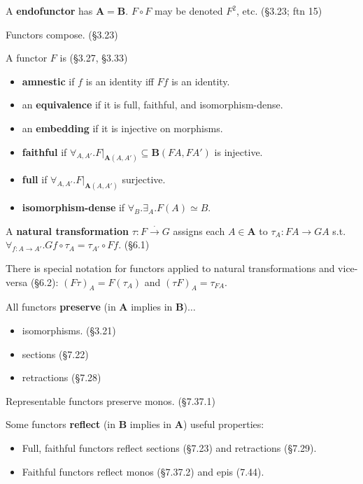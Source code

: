 \documentclass[10pt,twocolumn,letterpaper]{article}
\newcommand{\natto}{\overset{\cdot}{\to}}
\newcommand{\defn}[1]{{\bf #1}}
\begin{document}
  A \defn{endofunctor} has $\mathbf{A} = \mathbf{B}$.  $F \circ F$ may be
  denoted $F^2$, etc. (\S3.23; ftn 15)

  Functors compose. (\S3.23)

  A functor $F$ is (\S3.27, \S3.33)
  \begin{itemize}
    \item \defn{amnestic} if $f$ is an identity iff $Ff$ is an identity.
    \item an \defn{equivalence} if it is full, faithful, and
      isomorphism-dense.
    \item an \defn{embedding} if it is injective on morphisms.
    \item \defn{faithful} if $\forall_{A,A'} . F\vert_{\mathbf{A}(A,A')}
      \subseteq \mathbf{B}(FA, FA')$ is injective.
    \item \defn{full} if $\forall_{A,A'} . F\vert_{\mathbf{A}(A,A')}$ surjective.
    \item \defn{isomorphism-dense} if $\forall_B . \exists_A . F(A) \simeq B$.
  \end{itemize}

  A \defn{natural transformation} $\tau : F \natto G$ assigns each
  $A \in \mathbf{A}$ to $\tau_A : FA \to GA$ s.t.
  $\forall_{f : A \to A'} . G f \circ \tau_A = \tau_{A'} \circ F f$. (\S6.1)

  There is special notation for functors applied to natural transformations
  and vice-versa (\S6.2): $(F\tau)_A = F(\tau_A)$ and $(\tau F)_A =
  \tau_{FA}$.

  All functors \defn{preserve} (in $\mathbf{A}$ implies in $\mathbf{B}$)$\dots$
    \begin{itemize}
      \item isomorphisms. (\S3.21)
      \item sections (\S7.22)
      \item retractions (\S7.28)
    \end{itemize}

  Representable functors preserve monos. (\S7.37.1)

  Some functors \defn{reflect} (in $\mathbf{B}$ implies in $\mathbf{A}$) useful properties:
  \begin{itemize}
      \item Full, faithful functors reflect sections (\S7.23) and retractions (\S7.29).
      \item Faithful functors reflect monos (\S7.37.2) and epis (7.44).
  \end{itemize}
\end{document}

